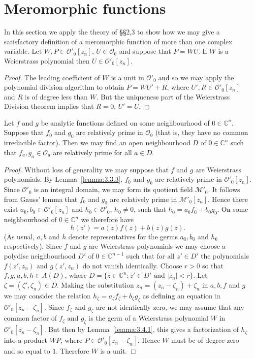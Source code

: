 \section{Meromorphic functions}\label{sec:3:4}
In this section we apply the theory of \S\S2,3 to show how we may give a satisfactory definition of a meromorphic function of more than one complex variable.
 Let $W,P\in\mathcal O'_0[z_n]$, $U\in\mathcal O_0$ and suppose that $P=WU$. If $W$ is a Weierstrass polynomial then $U\in\mathcal O'_0[z_n]$.
\begin{proof}
The leading coefficient of $W$ is a unit in $\mathcal O'_0$ and so we may apply the polynomial division algorithm to obtain $P=WU'+R$, where $U',R\in\mathcal O'_0[z_n]$ and $R$ is of degree less than $W$. But the uniqueness part of the Weierstrass Division theorem implies that $R=0$, $U'=U$.
\end{proof}
 Let $f$ and $g$ be analytic functions defined on some neighbourhood of $0\in\mathbb C^n$. Suppose that $f_0$ and $g_0$ are relatively prime in $\mathcal O_0$ (that is, they have no common irreducible factor). Then we may find an open neighbourhood $D$ of $0\in\mathbb C^n$ such that $f_a,g_a\in\mathcal O_a$ are relatively prime for all $a\in D$.
\begin{proof}
Without loss of generality we may suppose that $f$ and $g$ are Weierstrass polynomials. By Lemma~\ref{lemma:3.3.3}, $f_0$ and $g_0$ are relatively prime in $\mathcal O'_0[z_n]$. Since $\mathcal O'_0$ is an integral domain, we may form its
quotient field $\mathcal M'_0$. It follows from Gauss' lemma that $f_0$ and $g_0$ are relatively prime in $\mathcal M'_0[z_n]$. Hence there exist $a_0,b_0\in\mathcal O'_0[z_n]$ and $h_0\in\mathcal O'_0$, $h_0\ne0$, such that $h_0=a_0f_0+b_0g_0$. On some neighbourhood of $0\in\mathbb C^n$ we therefore have
\[h(z')=a(z)f(z)+b(z)g(z).\]
(As usual, $a,b$ and $h$ denote representatives for the germs $a_0,b_0$ and $h_0$ respectively). Since $f$ and $g$ are Weierstrass polynomials we may choose a polydisc neighbourhood $D'$ of $0\in\mathbb C^{n-1}$ such that for all $z'\in D'$ the polynomials $f(z',z_n)$ and $g(z',z_n)$ do not vanish identically. Choose $r>0$ so that $f,g,a,b,h\in A(D)$, where $D=\{z\in\mathbb C^n:z'\in D'\text{ and }|z_n|<r\}$. Let $\zeta=(\zeta',\zeta_n)\in D$. Making the substitution $z_n=(z_n-\zeta_n)+\zeta_n$ in $a,b,f$ and $g$ we may consider the relation $h_\zeta=a_\zeta f_\zeta+b_\zeta g_\zeta$ as defining an equation in $\mathcal O'_0[z_n-\zeta_n]$. Since $f_\zeta$ and $g_\zeta$ are not identically zero, we may assume that any common factor of $f_\zeta$ and $g_\zeta$ is the germ of a Weierstrass polynomial $W$ in $\mathcal O'_0[z_n-\zeta_n]$. But then by Lemma~\ref{lemma:3.4.1}, this gives a factorization of $h_\zeta$ into a product $WP$, where $P\in\mathcal O'_0[z_n-\zeta_n]$. Hence $W$ must be of degree zero and so equal to $1$. Therefore $W$ is a unit.
\end{proof}
